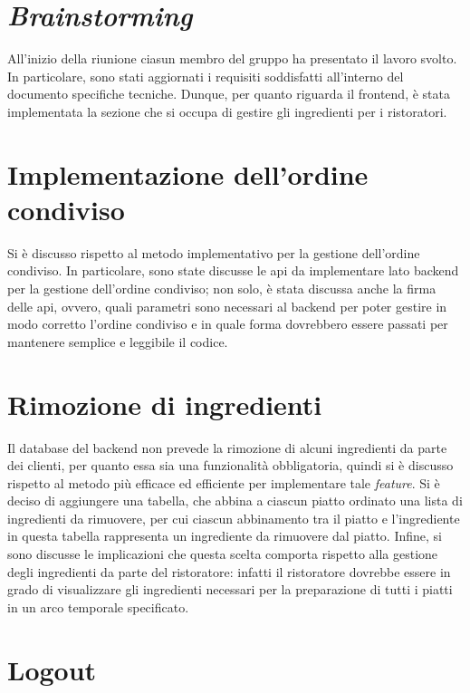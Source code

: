 \section{\textit{Brainstorming}}

All'inizio della riunione ciasun membro del gruppo ha presentato il lavoro
svolto. In particolare, sono stati aggiornati i requisiti soddisfatti
all'interno del documento specifiche tecniche.  
Dunque, per quanto riguarda il frontend, è stata implementata la sezione che si
occupa di gestire gli ingredienti per i ristoratori.

\section{Implementazione dell'ordine condiviso}

Si è discusso rispetto al metodo implementativo per la gestione dell'ordine
condiviso. In particolare, sono state discusse le api da implementare lato
backend per la gestione dell'ordine condiviso; non solo, è stata discussa anche
la firma delle api, ovvero, quali parametri sono necessari al backend per poter
gestire in modo corretto l'ordine condiviso e in quale forma dovrebbero essere
passati per mantenere semplice e leggibile il codice.

\section{Rimozione di ingredienti}

Il database del backend non prevede la rimozione di alcuni ingredienti da parte
dei clienti, per quanto essa sia una funzionalità obbligatoria, quindi si è
discusso rispetto al metodo più efficace ed efficiente per implementare tale
\textit{feature}. Si è deciso di aggiungere una tabella, che abbina a ciascun
piatto ordinato una lista di ingredienti da rimuovere, per cui ciascun
abbinamento tra il piatto e l'ingrediente in questa tabella rappresenta un
ingrediente da rimuovere dal piatto. Infine, si sono discusse le implicazioni
che questa scelta comporta rispetto alla gestione degli ingredienti da parte del
ristoratore: infatti il ristoratore dovrebbe essere in grado di visualizzare gli
ingredienti necessari per la preparazione di tutti i piatti in un arco
temporale specificato.

\section{Logout}

